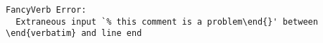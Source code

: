 \documentclass{article}
\begin{document}
\begin{verbatim}
FancyVerb Error:
  Extraneous input `% this comment is a problem\end{}' between \end{verbatim} and line end
\end{verbatim}
\end{document}
